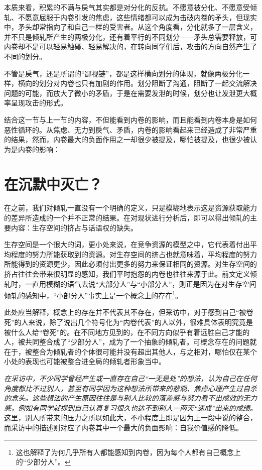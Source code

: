 \documentclass[UTF8,a4paper,fontset=windows,11pt,openany]{ctexbook}
\begin{document}
本质来看，积累的不满与戾气其实都是对分化的反抗。不愿意被分化、不愿意受倾轧、不愿意屈服于内卷引发的焦虑，这些情绪都可以成为击破内卷的矛头，但现实中，矛头却常指向了和自己一样的受害者。从这个角度看，分化就多了一层含义，并不只是倾轧所产生的两极分化，还有着平行的不同划分——矛头总需要释放，可内卷却不是可以轻易触碰、轻易解决的，在转向同学们后，攻击的方向自然产生了不同的划分。

不管是戾气，还是所谓的“鄙视链”，都是这样横向划分的体现，就像两极分化一样，横向的划分对内卷也只有加剧的作用。划分阻断了沟通，阻断了一起交流解决问题的可能，而放大了微小的矛盾，于是在需要发泄的时候，划分也让发泄更大概率呈现攻击的形式。

结合这一节与上一节的内容，不但能看到内卷的影响，而且能看到内卷本身是如何恶性循环的。从焦虑、无力到戾气、矛盾，内卷的影响看起来已经造成了非常严重的结果，然而，内卷最大的负面作用之一却很少被提及，哪怕被提及，也很少被认为是内卷的影响：

\section{在沉默中灭亡？}

在之前，我们对倾轧一直没有一个明确的定义，只是模糊地表示这是资源获取能力的差异所造成的一个并不正常的结果。在对现状进行分析后，即可以得出倾轧的主要内容：生存空间的挤占与话语权的缺失。

生存空间是一个很大的词，更小处来说，在竞争资源的模型之中，它代表着付出平均程度的努力所能获取到的资源。对生存空间的挤占也就意味着，平均程度的努力所能得到的资源更少，因此必须付出更多的努力来保证相同的资源。对生存空间的挤占往往会带来很明显的感知，我们平时抱怨的内卷也往往来源于此。前文定义倾轧时，一直用模糊的语气去说“大部分人”与“小部分人”，则正是因为在对生存空间倾轧的感知中，“小部分人”事实上是一个概念上的存在\footnote{这也解释了为何几乎所有人都能感知到内卷，因为每个人都有自己概念上的“少部分人”。}。

此处应当解释，概念上的存在并不代表其不存在，但采访中，对于感到自己“被卷死”的人来说，除了说出几个符号化为“内卷代表”的人以外，很难具体表明究竟是被什么人给“卷死”的。在不同地方见到的，在不同方向似乎有着远胜自己才能的人，被共同整合成了“少部分人”，成为了一个抽象的倾轧者。可概念存在的问题就在于，被整合为倾轧者的个体很可能并没有超出其他人，与之相对，哪怕仅在某个小处的表现也可能被整合进全局的倾轧者形象当中。

\emph{在采访中，不少同学曾经产生或一直存在自己“一无是处”的想法，认为自己在任何角度都比不过别人，甚至有同学因为这种想法所带来的悲观、焦虑心理产生过自杀的念头。这些想法的产生原因往往是与别人比较的落差感与努力看不出成效的无力感，例如有同学就提到自己认真复习很久也达不到别人一两天“速成”出来的成绩。}这里，别人所带来的压力之所以如此大，不小程度上即是因为上一段中说的整合，而采访中的描述则对应了内卷其中一个最大的负面影响：自我价值感的降低。
\end{document}
